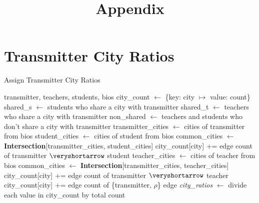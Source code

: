 \documentclass[12pt,english]{article}
\title{\textbf{Appendix}}
\date{}
\newcommand{\myindent}[1]{
\newline\makebox[#1cm]{}
}
\begin{document}
\maketitle

\section{Transmitter City Ratios}
\begin{center}
\begin{minipage}{.8\linewidth}
\begin{algorithm}[H]
\caption{Assign Transmitter City Ratios}\label{euclid}
\begin{algorithmic}[1]
\Require transmitter, teachers, students, bios
\State city\_count $\gets$ \{key: city $\mapsto$ value: count\}
\State shared\_s $\gets$ students who share a city with transmitter 
\State shared\_t $\gets$ teachers who share a city with transmitter
\State non\_shared $\gets$ teachers and students who don't share a city with \myindent{2.4} transmitter
\State transmitter\_cities $\gets$ cities of transmitter from bios
\State student\_cities $\gets$ cities of student from bios
\State common\_cities $\gets$ \textbf{Intersection}[transmitter\_cities, \myindent{5.95} student\_cities]
    \State city\_count[city] += edge count of transmitter $\veryshortarrow$ student
    \EndForeach
\EndForeach
{}
\State teacher\_cities $\gets$ cities of teacher from bios
\State common\_cities $\gets$ \textbf{Intersection}[transmitter\_cities, \myindent{5.95} teacher\_cities]
    \State city\_count[city] += edge count of transmitter $\veryshortarrow$ teacher
    \EndForeach
\EndForeach
{}
    \State city\_count[city] += edge count of \{transmitter, $\rho$\} edge
    \EndForeach
\EndForeach
\State \textit{city\_ratios} $\gets$ divide each value in city\_count by total count
\end{algorithmic}
\end{algorithm}
\end{minipage}
\end{center}
\end{document}
